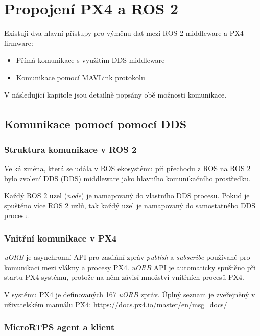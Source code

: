 \chapter{Propojení PX4 a ROS 2}

Existuji dva hlavní přístupy pro výměnu dat mezi ROS 2 middleware a PX4 firmware:

\begin{itemize}
    \item Přímá komunikace s využitím \acs{DDS} middleware
    \item Komunikace pomocí MAVLink protokolu\\
\end{itemize}

V následující kapitole jsou detailně popsány obě možnosti komunikace.

\section{Komunikace pomocí pomocí DDS\texorpdfstring{\textsuperscript{\textregistered}}{ (R)}}

\subsection{Struktura komunikace v ROS 2}

Velká změna, která se udála v ROS ekosystému při přechodu z ROS na ROS 2 bylo zvolení \acs{DDS} (\acl{DDS}) middleware jako hlavního komunikačního prostředku.

Každý ROS 2 uzel (\textit{node}) je namapovaný do vlastního \acs{DDS} procesu. Pokud je spuštěno více ROS 2 uzlů, tak každý uzel je namapovaný do samostatného \acs{DDS} procesu. \cite{ROS2DDS3}

\subsection{Vnitřní komunikace v PX4}

\textit{uORB} je asynchronní \acs{API} pro zasílání zpráv \textit{publish} a \textit{subscribe} používané pro komunikaci mezi vlákny a procesy PX4. \textit{uORB} \acs{API} je automaticky spuštěno při startu PX4 systému, protože na něm závisí množství vnitřních procesů PX4.

V systému PX4 je definovaných 167 \textit{uORB} zpráv. Úplný seznam je zveřejněný v uživatelském manuálu PX4: \url{https://docs.px4.io/master/en/msg_docs/} \cite{PX4docs}

\subsection{MicroRTPS agent a klient}
\label{sec:komunikace}


